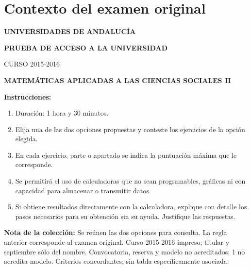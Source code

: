 \section*{Contexto del examen original}
\textbf{UNIVERSIDADES DE ANDALUCÍA}\par
\textbf{PRUEBA DE ACCESO A LA UNIVERSIDAD}\par
CURSO 2015-2016\par
\textbf{MATEMÁTICAS APLICADAS A LAS CIENCIAS SOCIALES II}

\textbf{Instrucciones:}
\begin{enumerate}[label=\textbf{\alph*)}]
  \item Duración: 1 hora y 30 minutos.
  \item Elija una de las dos opciones propuestas y conteste los ejercicios de la opción elegida.
  \item En cada ejercicio, parte o apartado se indica la puntuación máxima que le corresponde.
  \item Se permitirá el uso de calculadoras que no sean programables, gráficas ni con capacidad para almacenar o transmitir datos.
  \item Si obtiene resultados directamente con la calculadora, explique con detalle los pasos necesarios para su obtención sin su ayuda. Justifique las respuestas.
\end{enumerate}
\noindent\textbf{Nota de la colección:} Se reúnen las dos opciones para consulta. La regla anterior corresponde al examen original. Curso 2015-2016 impreso; titular y septiembre sólo del nombre. Convocatoria, reserva y modelo no acreditados; 1 no acredita modelo. Criterios concordantes; sin tabla específicamente asociada.
\par\medskip
